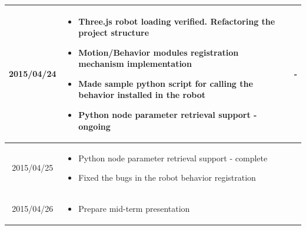\documentclass[11pt]{article} %
\begin{document}
\begin{center}
\begin{longtable}{ | c | p{6cm} | p{5cm} |}
  2015/04/24         & 
  \begin{itemize}
  \item Three.js robot loading verified. Refactoring the project structure
  \item Motion/Behavior modules registration mechanism implementation
  \item Made sample python script for calling the behavior installed in the robot
  \item Python node parameter retrieval support - ongoing
\end{itemize}   
  & 
  - 
\\
  										 \hline
  										 
	 2015/04/25         & 
  \begin{itemize}
  \item Python node parameter retrieval support - complete
  \item Fixed the bugs in the robot behavior registration
\end{itemize}   
  & 
		\\					 \hline  	

	 2015/04/26         & 
  \begin{itemize}
  \item Prepare mid-term presentation
\end{itemize}   
  & 
		\\					 \hline  	
										 
  										   								 
    \end{longtable}
\end{center}
\end{document}
